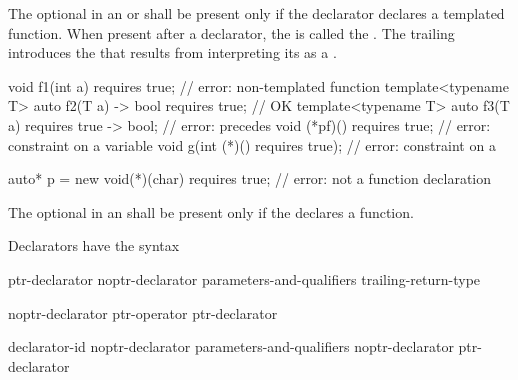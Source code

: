 \pnum
The optional  in an
 or 
shall be present only if the declarator declares a
templated function.
%
%
When present after a declarator, the 
is called the .
The trailing  introduces the
 that results from interpreting
its  as a
.
%
\begin{example}
\begin{codeblock}
void f1(int a) requires true;               // error: non-templated function
template<typename T>
  auto f2(T a) -> bool requires true;       // OK
template<typename T>
  auto f3(T a) requires true -> bool;       // error:  precedes 
void (*pf)() requires true;                 // error: constraint on a variable
void g(int (*)() requires true);            // error: constraint on a 

auto* p = new void(*)(char) requires true;  // error: not a function declaration
\end{codeblock}
\end{example}

\pnum
The optional 
in an 
shall be present only if
the  declares a function.

\pnum
Declarators have the syntax

\begin{bnf}
\br
    ptr-declarator\br
    noptr-declarator parameters-and-qualifiers trailing-return-type
\end{bnf}

\begin{bnf}
\br
    noptr-declarator\br
    ptr-operator ptr-declarator
\end{bnf}

\begin{bnf}
\br
    declarator-id \br
    noptr-declarator parameters-and-qualifiers\br
    noptr-declarator \terminal{[}  \terminal{]} \br
    \terminal{(} ptr-declarator \terminal{)}
\end{bnf}

